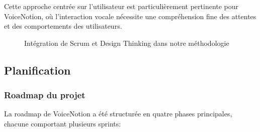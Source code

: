 Cette approche centrée sur l'utilisateur est particulièrement pertinente pour VoiceNotion, où l'interaction vocale nécessite une compréhension fine des attentes et des comportements des utilisateurs.

\begin{figure}[H]
    \centering
    \caption{Intégration de Scrum et Design Thinking dans notre méthodologie}
    \label{fig:agile_design_thinking}
\end{figure}

\subsection{Planification}

\subsubsection{Roadmap du projet}

La roadmap de VoiceNotion a été structurée en quatre phases principales, chacune comportant plusieurs sprints:

